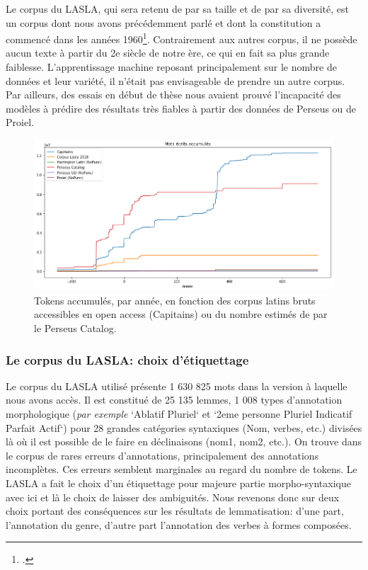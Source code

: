 Le corpus du LASLA, qui sera retenu de par sa taille et de par sa diversité, est un corpus dont nous avons précédemment parlé et dont la constitution a commencé dans les années 1960\footcites{delatte_laboratoire_1961}{BodsonCodification1966}. Contrairement aux autres corpus, il ne possède aucun texte à partir du 2e siècle de notre ère, ce qui en fait sa plus grande faiblesse. L'apprentissage machine reposant principalement sur le nombre de données et leur variété, il n'était pas envisageable de prendre un autre corpus. Par ailleurs, des essais en début de thèse nous avaient prouvé l'incapacité des modèles à prédire des résultats très fiables à partir des données de Perseus ou de Proiel.

\begin{figure}
    \includegraphics[width=\linewidth]{results/lemmatisation/corpus/tokens_per_year.png}
    \caption{Tokens accumulés, par année, en fonction des corpus latins bruts accessibles en open access (Capitains) ou du nombre estimés de par le Perseus Catalog.}
    \label{fig:lemmatisation:corpus-entrainement}
\end{figure}

\subsubsection{Le corpus du LASLA: choix d'étiquettage}

Le corpus du LASLA utilisé présente 1 630 825 mots dans la version à laquelle nous avons accès. Il est constitué de 25 135 lemmes, 1 008 types d'annotation morphologique (\textit{par exemple}  `Ablatif Pluriel` et `2eme personne Pluriel Indicatif Parfait Actif`) pour 28 grandes catégories syntaxiques (Nom, verbes, etc.) divisées là où il est possible de le faire en déclinaisons (nom1, nom2, etc.). On trouve dans le corpus de rares erreurs d'annotations, principalement des annotations incomplètes. Ces erreurs semblent marginales au regard du nombre de tokens. Le LASLA a fait le choix d'un étiquettage pour majeure partie morpho-syntaxique avec ici et là le choix de laisser des ambiguités. Nous revenons donc sur deux choix portant des conséquences sur les résultats de lemmatisation: d'une part, l'annotation du genre, d'autre part l'annotation des verbes à formes composées.


